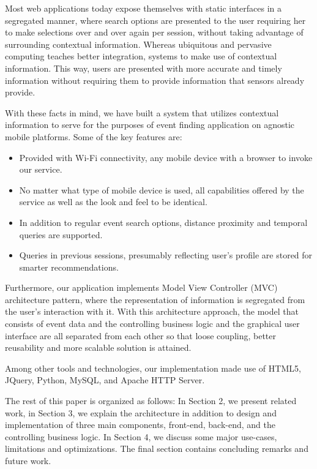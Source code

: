 \documentclass{acm_proc_article-sp}
\begin{document}
Most web applications today expose themselves with static interfaces in a segregated manner, where search options are presented to the user requiring her to make selections over and over again per session, without taking advantage of surrounding contextual information. Whereas ubiquitous and pervasive computing teaches better integration, systems to make use of contextual information. This way, users are presented with more accurate and timely information without requiring them to provide information that sensors already provide.

With these facts in mind, we have built a system that utilizes contextual information to serve for the purposes of event finding application on agnostic mobile platforms. Some of the key features are:
\begin{itemize}
\item Provided with Wi-Fi connectivity, any mobile device with a browser to invoke our service.
\item No matter what type of mobile device is used, all capabilities offered by the service as well as the look and feel to be identical. 
\item In addition to regular event search options, distance proximity and temporal queries are supported. 
\item Queries in previous sessions, presumably reflecting user's profile are stored for smarter recommendations. 
\end{itemize}

Furthermore, our application implements Model View Controller (MVC) architecture pattern, where the representation of information is segregated from the user's interaction with it. With this architecture approach, the model that consists of event data and the controlling business logic and the graphical user interface are all separated from each other so that loose coupling, better reusability and more scalable solution is attained.

Among other tools and technologies, our implementation made use of HTML5, JQuery, Python, MySQL, and Apache HTTP Server.

The rest of this paper is organized as follows: In Section 2, we present related work, in Section 3, we explain the architecture in addition to design and implementation of three main components, front-end, back-end, and the controlling business logic. In Section 4, we discuss some major use-cases, limitations and optimizations. The final section contains concluding remarks and future work.
\end{document}
